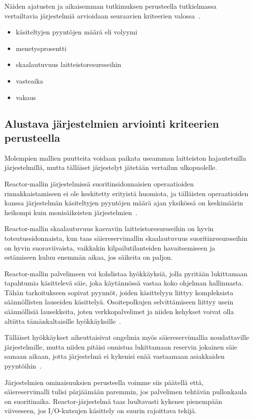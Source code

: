 \documentclass[12pt]{article}
\begin{document}
Näiden ajatusten ja aikaisemman tutkimuksen perusteella
tutkielmassa vertailtavia järjestelmiä arvioidaan seuraavien
kriteerien valossa~\cite{gokhale_performance_2006}.
\begin{itemize}
    \item käsiteltyjen pyyntöjen määrä eli volyymi
    \item menetysprosentti
    \item skaalautuvuus laitteistoresursseihin
    \item vasteaika
    \item vakaus
\end{itemize}
\subsection{Alustava järjestelmien arviointi kriteerien perusteella}
Molempien mallien puutteita voidaan paikata useamman laitteiston hajautetuilla
järjestelmillä, mutta tälläiset järjestelyt jätetään vertailun ulkopuolelle.

Reactor-mallin järjestelmissä suoritinsidonnaisien
operaatioiden rinnakkaistamiseen ei ole keskitetty erityistä huomiota, ja tälläisten operaatioiden
kanssa järjestelmän käsiteltyjen pyyntöjen määrä ajan yksikössä on keskimäärin heikompi
kuin monisäikeisten järjestelmien~\cite{davis_case_2017}.

Reactor-mallin skaalautuvuus kasvaviin laitteistoresursseihin on hyvin
toteutussidonnaista, kun taas
säiereservimallin skaalautuvuus suoritinresursseihin on hyvin suoraviivaista,
vaikkakin kilpailutilanteiden havaitsemiseen ja estämiseen kuluu enemmän aikaa,
jos säikeita on paljon.

Reactor-mallin palvelimeen voi kohdistaa hyökkäyksiä, jolla pyritään
lukittamaan tapahtumia käsittelevä säie, joka käytännössä vastaa koko ohjelman hallinnasta.
Tähän tarkoitukseen sopivat pyynnöt,
joiden käsittelyyn liittyy kompleksista säännöllisten lauseiden käsittelyä.
Osoitepolkujen selvittämiseen liittyy usein säännöllisiä lausekkeita,
joten verkkopalvelimet ja niiden
kehykset voivat olla altiitta tämänkaltaisille hyökkäyksille~\cite{davis_case_2017}.

Tälläiset hyökkäykset aiheuttaisivat ongelmia myös säiereservimallia
noudattaville järjestelmille, mutta niiden pitäisi onnistua
lukittamaan reservin jokainen säie samaan aikaan, jotta
järjestelmä ei kykenisi enää vastaamaan asiakkaiden pyyntöihin~\cite{davis_case_2017}.

Järjestelmien ominaisuuksien perusteella voimme siis päätellä että,
säiereservimalli
tulisi pärjäämään paremmin, jos palvelimen tehtävän pullonkaula on suoritinaika.
Reactor-järjestelmä
taas luultavasti kykenee pienempään viiveeseen,
jos I/O-kutsujen käsittely on suurin rajoittava tekijä.
\end{document}
